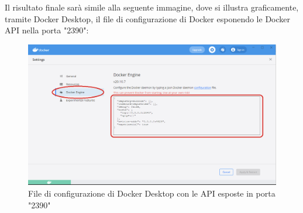 Il risultato finale sarà simile alla seguente immagine, dove si illustra graficamente, tramite Docker Desktop, il file di configurazione di Docker esponendo le Docker API nella porta "2390":
\begin{figure}[!h]     
\centering 
    \includegraphics[width=1.2\columnwidth]{immagini/img/docker_desktop_conf} 
    \caption{File di configurazione di Docker Desktop con le API esposte in porta "2390"}
\end{figure} 













